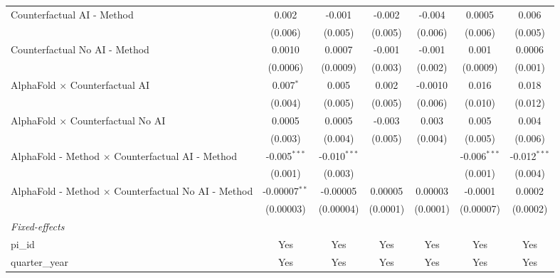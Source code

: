 \begin{tabular}{lcccccc}
   Counterfactual AI - Method                                 & 0.002           & -0.001         & -0.002   & -0.004   & 0.0005         & 0.006\\   
                                                              & (0.006)         & (0.005)        & (0.005)  & (0.006)  & (0.006)        & (0.005)\\   
   Counterfactual No AI - Method                              & 0.0010          & 0.0007         & -0.001   & -0.001   & 0.001          & 0.0006\\   
                                                              & (0.0006)        & (0.0009)       & (0.003)  & (0.002)  & (0.0009)       & (0.001)\\   
   AlphaFold $\times$ Counterfactual AI                       & 0.007$^{*}$     & 0.005          & 0.002    & -0.0010  & 0.016          & 0.018\\   
                                                              & (0.004)         & (0.005)        & (0.005)  & (0.006)  & (0.010)        & (0.012)\\   
   AlphaFold $\times$ Counterfactual No AI                    & 0.0005          & 0.0005         & -0.003   & 0.003    & 0.005          & 0.004\\   
                                                              & (0.003)         & (0.004)        & (0.005)  & (0.004)  & (0.005)        & (0.006)\\   
   AlphaFold - Method $\times$ Counterfactual AI - Method     & -0.005$^{***}$  & -0.010$^{***}$ &          &          & -0.006$^{***}$ & -0.012$^{***}$\\   
                                                              & (0.001)         & (0.003)        &          &          & (0.001)        & (0.004)\\   
   AlphaFold - Method $\times$ Counterfactual No AI - Method  & -0.00007$^{**}$ & -0.00005       & 0.00005  & 0.00003  & -0.0001        & 0.0002\\   
                                                              & (0.00003)       & (0.00004)      & (0.0001) & (0.0001) & (0.00007)      & (0.0002)\\   
   \midrule
   \emph{Fixed-effects}\\
   pi\_id                                                     & Yes             & Yes            & Yes      & Yes      & Yes            & Yes\\  
   quarter\_year                                              & Yes             & Yes            & Yes      & Yes      & Yes            & Yes\\  

\end{tabular}
